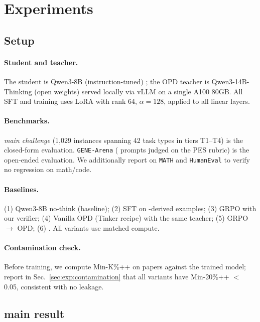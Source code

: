 \section{Experiments}
\label{sec:exp}

\subsection{Setup}
\label{sec:exp:setup}

\paragraph{Student and teacher.} The student is Qwen3-8B
(instruction-tuned) \citep{qwen3_2025}; the OPD teacher is
Qwen3-14B-Thinking (open weights) served locally via vLLM on a single
A100 80GB. All SFT and \evoopd{} training uses LoRA \citep{hu2021lora}
with rank 64, $\alpha=128$, applied to all linear layers.

\paragraph{Benchmarks.}
\geneexam{} \emph{main challenge} (1,029 instances spanning 42 task
types in tiers T1--T4) is the closed-form evaluation. \texttt{GENE-Arena}
( prompts judged on the PES rubric) is the open-ended
evaluation. We additionally report on \texttt{MATH} and \texttt{HumanEval}
to verify no regression on math/code.

\paragraph{Baselines.} (1) Qwen3-8B no-think (baseline); (2) SFT on
\genetrace-derived examples; (3) GRPO with our verifier; (4) Vanilla OPD
(Tinker recipe) with the same teacher; (5) GRPO $\to$ OPD; (6) \evoopd{}.
All variants use matched compute.

\paragraph{Contamination check.} Before training, we compute Min-K\%++
\citep{shi2024minkpp} on \geneexam{} papers against the trained model;
report in Sec.~\ref{sec:exp:contamination} that all variants have
Min-20\%++ $<$ 0.05, consistent with no leakage.

\subsection{\geneexam{} main result}
\label{sec:exp:main}

